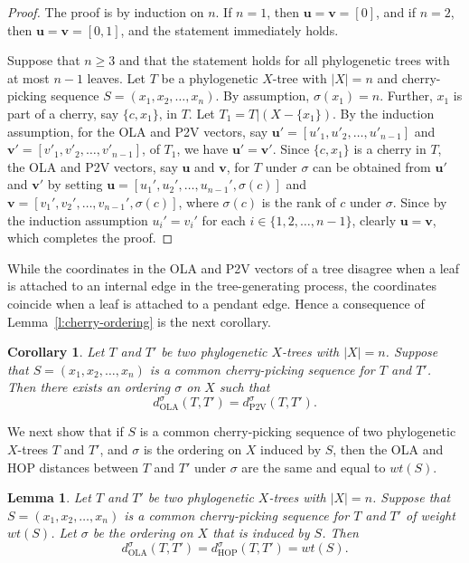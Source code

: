 \documentclass{article}
\newtheorem{lemma}{Lemma}
\newtheorem{cor}{Corollary}
\newcommand{\HOP}{\mathrm{HOP}}
\newcommand{\OLA}{\mathrm{OLA}}
\newcommand{\PV}{\mathrm{P2V}}
\begin{document}
\begin{proof}
    The proof is by induction on $n$. If $n=1$, then $\mathbf{u}=\mathbf{v}=[0]$, and if $n=2$, then $\mathbf{u} = \mathbf{v}= [0,1]$, and the statement immediately holds. 
    
    Suppose that $n \geq 3$ and that the statement holds for all  phylogenetic trees with at most $n-1$ leaves. Let $T$ be a phylogenetic $X$-tree with $|X|=n$ and cherry-picking sequence $S = (x_1, x_2,\ldots, x_n)$. By assumption, $\sigma(x_1)=n$. Further, $x_1$ is part of a cherry, say $\{c,x_1\}$, in $T$. Let $T_1 = T|(X - \{x_1\})$. By the induction assumption, for
    the OLA and P2V vectors, say $\mathbf{u}'=[u'_1, u'_2,\ldots, u'_{n-1}]$ and $\mathbf{v}'=[v'_1,v'_2, \ldots, v'_{n-1}]$, of $T_1$, we have $\mathbf{u}' = \mathbf{v}'$. 
    Since $\{c,x_1\}$ is a cherry in $T$, the OLA and P2V vectors, say $\mathbf{u}$ and $\mathbf{v}$, for $T$ under $\sigma$ can be obtained from $\mathbf{u}'$ and $\mathbf{v}'$ by setting $\mathbf{u} = [u_1', u_2',\ldots, u_{n-1}',\sigma(c)]$ and $\mathbf{v} = [v_1',v_2', \ldots, v_{n-1}',\sigma(c)]$, where $\sigma(c)$ is the rank of $c$ under $\sigma$. Since by the induction assumption $u_i' = v_i'$ for each $i \in \{1,2, \ldots, n-1\}$, clearly $\mathbf{u} = \mathbf{v}$, which completes the proof. 
\end{proof}

While the coordinates in the OLA and P2V vectors of a tree disagree when a leaf is attached to an internal edge in the tree-generating process, the coordinates coincide when a leaf is attached to a pendant edge. Hence a consequence of Lemma~\ref{l:cherry-ordering} is the next corollary.


\begin{cor}
    Let $T$ and $T'$ be two  phylogenetic $X$-trees with $|X|=n$. Suppose that $S=(x_1, x_2, \ldots, x_n)$ is a common cherry-picking sequence for $T$ and $T'$. Then there exists an ordering $\sigma$ on $X$ such that
    $$
    d_{\OLA}^{\sigma}(T,T') = 
    d_{\PV}^{\sigma}(T,T').
    $$
    \label{cor:ola-hop-equiv}
\end{cor}


We next show that if $S$ is a common cherry-picking sequence of two phylogenetic $X$-trees $T$ and $T'$, and $\sigma$ is the ordering on $X$ induced by $S$, then the OLA and HOP distances between $T$ and $T'$ under $\sigma$ are the same and equal to $wt(S)$.

\begin{lemma}\label{l:need-a-label}
    Let $T$ and $T'$ be two phylogenetic $X$-trees with $|X|=n$. Suppose that $S=(x_1, x_2, \ldots, x_n)$ is a common cherry-picking sequence for $T$ and $T'$ of weight $wt(S)$. Let $\sigma$ be the ordering on $X$ that is induced by $S$.
    Then
    $$
        d_{\OLA}^{\sigma}(T,T') = 
        d_{\HOP}^{\sigma}(T,T') = wt(S).
    $$
    
    \label{lem:p2v-hop-equiv}
\end{lemma}
\end{document}

